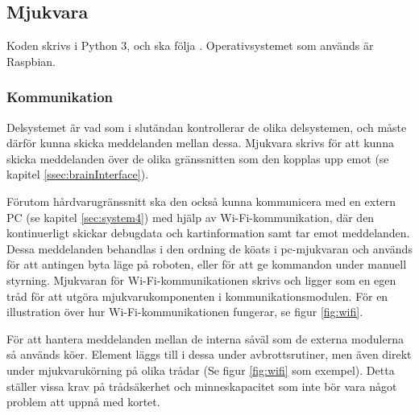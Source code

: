 \documentclass[a4paper,11pt]{article}
\begin{document}
\subsection{Mjukvara}
Koden skrivs i Python 3, och ska följa \cite{pep8}. Operativsystemet som används är Raspbian.

\subsubsection{Kommunikation}
Delsystemet är vad som i slutändan kontrollerar de olika delsystemen, och måste därför kunna skicka meddelanden mellan dessa. Mjukvara skrivs för att kunna skicka meddelanden över de olika gränssnitten som den kopplas upp emot (se kapitel \ref{ssec:brainInterface}).

Förutom hårdvarugränssnitt ska den också kunna kommunicera med en extern PC (se kapitel \ref{sec:system4}) med hjälp av Wi-Fi-kommunikation, där den kontinuerligt skickar debugdata och kartinformation samt tar emot meddelanden. Dessa meddelanden behandlas i den ordning de köats i pc-mjukvaran och används för att antingen byta läge på roboten, eller för att ge kommandon under manuell styrning. Mjukvaran för Wi-Fi-kommunikationen skrivs och ligger som en egen tråd för att utgöra mjukvarukomponenten i kommunikationsmodulen. För en illustration över hur Wi-Fi-kommunikationen fungerar, se figur \ref{fig:wifi}.

För att hantera meddelanden mellan de interna såväl som de externa modulerna så används köer. Element läggs till i dessa under avbrottsrutiner, men även direkt under mjukvarukörning på olika trådar (Se figur \ref{fig:wifi} som exempel). Detta ställer vissa krav på trådsäkerhet och minneskapacitet som inte bör vara något problem att uppnå med kortet.
\end{document}
